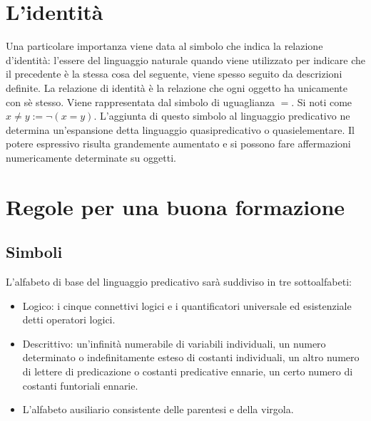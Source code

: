 \section{L'identit\`a}
Una particolare importanza viene data al simbolo che indica la relazione d'identit\`a: l'essere del linguaggio naturale quando viene utilizzato per indicare che il precedente \`e la stessa cosa del seguente, viene 
spesso seguito da descrizioni definite. La relazione di identit\`a \`e la relazione che ogni oggetto ha unicamente con s\`e stesso. Viene rappresentata dal simbolo di uguaglianza $=$. Si noti come $x\neq 
y:=\neg(x=y)$. L'aggiunta di questo simbolo al linguaggio predicativo ne determina un'espansione detta linguaggio quasipredicativo o quasielementare. Il potere espressivo risulta grandemente aumentato e si 
possono fare affermazioni numericamente determinate su oggetti.
\section{Regole per una buona formazione}
\subsection{Simboli}
L'alfabeto di base del linguaggio predicativo sar\`a suddiviso in tre sottoalfabeti:
\begin{itemize}
\item Logico: i cinque connettivi logici e i quantificatori universale ed esistenziale detti operatori logici.
\item Descrittivo: un'infinit\`a numerabile di variabili individuali, un numero determinato o indefinitamente esteso di costanti individuali, un altro numero di lettere di predicazione o costanti predicative ennarie, 
un certo numero di costanti funtoriali ennarie.
\item L'alfabeto ausiliario consistente delle parentesi e della virgola.
\end{itemize}
